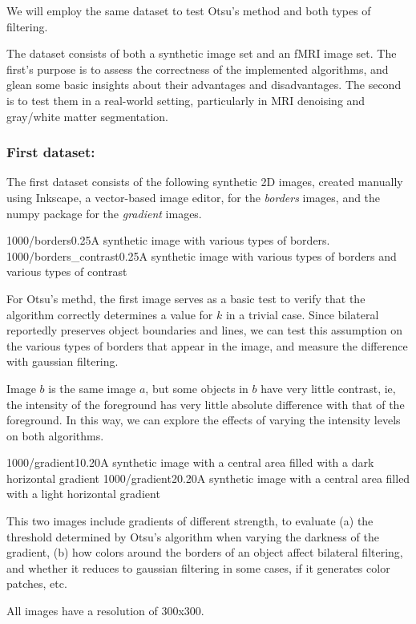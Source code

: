 We will employ the same dataset to test Otsu's method and both types of filtering.

The dataset consists of both a synthetic image set and an fMRI image set. The first's purpose is to assess the correctness of the implemented algorithms, and glean some basic insights about their advantages and disadvantages. The second is to test them in a real-world setting, particularly in MRI denoising and gray/white matter segmentation.

\subsubsection*{First dataset:}

The first dataset consists of the following synthetic 2D images, created manually using Inkscape, a vector-based image editor, for the \textit{borders} images, and the numpy package  for the \textit{gradient} images.

\imagetwo
{1000/borders}{0.25}{A synthetic image with various types of borders.}
{1000/borders_contrast}{0.25}{A synthetic image with various types of borders and various types of contrast}

For Otsu's methd, the first image serves as a basic test to verify that the algorithm correctly determines a value for $k$ in a trivial case. Since bilateral reportedly preserves object boundaries and lines, we can test this assumption on the various types of borders that appear in the image, and measure the difference with gaussian filtering.

Image $b$ is the same image $a$, but some objects in $b$ have very little contrast, ie, the intensity of the foreground has very little absolute difference with that of the foreground. In this way, we can explore the effects of varying the intensity levels on both algorithms.

\imagetwo
{1000/gradient1}{0.20}{A synthetic image with a central area filled with a dark horizontal gradient}
{1000/gradient2}{0.20}{A synthetic image with a central area filled with a light horizontal gradient}

This two images include gradients of different strength, to evaluate (a) the threshold determined by Otsu's algorithm when varying the darkness of the gradient, (b) how colors around the borders of an object affect bilateral filtering, and whether it reduces to gaussian filtering in some cases, if it generates color patches, etc.

All images have a resolution of 300x300.

